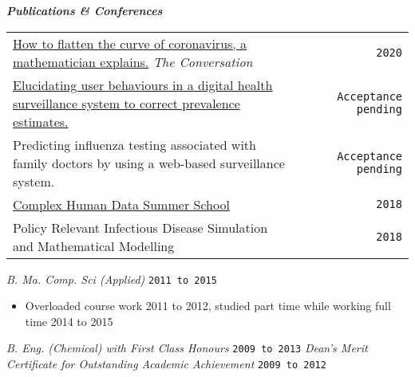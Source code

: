 \documentclass{article}
\begin{document}
\textbf{\emph{Publications \& Conferences}}
\begin{table}[h!] \small
\begin{tabular}{ p{12.1cm} c r}

\href{https://theconversation.com/how-to-flatten-the-curve-of-coronavirus-a-mathematician-explains-133514}{How to flatten the curve of coronavirus, a mathematician explains.} \emph{The Conversation} & & \texttt{2020} \\
	
 \href{https://www.medrxiv.org/content/10.1101/19003715v2}{Elucidating user behaviours in a digital health surveillance system to correct prevalence estimates.} & & \texttt{Acceptance pending} \\

 Predicting influenza testing associated with family doctors by using a web-based surveillance system. & & \texttt{Acceptance pending} \\

 \href{https://chdsummerschool.com/}{Complex Human Data Summer School} & & \texttt{2018} \\
 Policy Relevant Infectious Disease Simulation and Mathematical Modelling& & \texttt{2018} \\

\end{tabular}
\end{table}


\emph{B. Ma. Comp. Sci (Applied)} \hfill  \texttt{2011 to 2015}

{\footnotesize
\begin{itemize}
\item Overloaded course work 2011 to 2012, studied part time while working full time 2014 to 2015
\end{itemize} }

\emph{B. Eng. (Chemical) with First Class Honours} \hfill \texttt{2009 to 2013}
\emph{Dean's Merit Certificate for Outstanding Academic Achievement} \hfill \texttt{2009 to 2012}
\\


\end{document}
